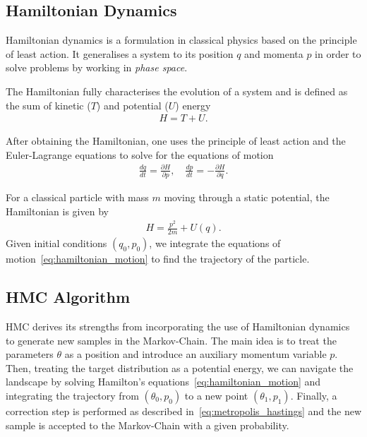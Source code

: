 \documentclass[11pt]{article}
\begin{document}
\subsection{Hamiltonian Dynamics}\label{subsec:hamiltonian_dynamics}
    Hamiltonian dynamics is a formulation in classical physics based on the principle of least action.
    It generalises a system to its position $q$ and momenta $p$ in order to solve problems by working in \emph{phase space}.

    The Hamiltonian fully characterises the evolution of a system and is defined as the sum of kinetic ($T$) and
    potential ($U$) energy
    \begin{equation}\label{eq:hamiltonian_definition}
    \begin{aligned}
        H = T + U.
    \end{aligned}
    \end{equation}

    After obtaining the Hamiltonian, one uses the principle of least action and the Euler-Lagrange equations to solve for
    the equations of motion
    \begin{equation}\label{eq:hamiltonian_motion}
    \begin{aligned}
        \frac{dq}{dt} = \frac{\partial H}{\partial p}, \quad \frac{dp}{dt} = -\frac{\partial H}{\partial q}.
    \end{aligned}
    \end{equation}

    For a classical particle with mass $m$ moving through a static potential, the Hamiltonian is given by
    \begin{equation}\label{eq:classic_hamiltonian}
    \begin{aligned}
        H = \frac{p^2}{2m} + U(q).
    \end{aligned}
    \end{equation}
    Given initial conditions $(q_0, p_0)$, we integrate the equations of motion~\eqref{eq:hamiltonian_motion} to find
    the trajectory of the particle.

\subsection{HMC Algorithm}\label{subsec:hmc_algorithm}
    HMC derives its strengths from incorporating the use of Hamiltonian dynamics to generate new samples in the Markov-Chain.
    The main idea is to treat the parameters $\theta$ as a position and introduce an auxiliary momentum variable $p$.
    Then, treating the target distribution as a potential energy, we can navigate the landscape by solving Hamilton's
    equations~\eqref{eq:hamiltonian_motion} and integrating the trajectory from $(\theta_0, p_0)$ to a new point
    $(\theta_1, p_1)$.
    Finally, a correction step is performed as described in~\eqref{eq:metropolis_hastings} and the new sample is accepted
    to the Markov-Chain with a given probability.
\end{document}
